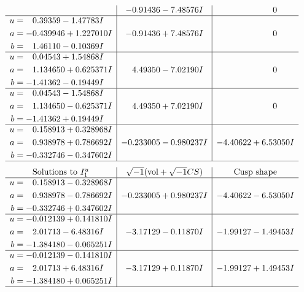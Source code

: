 \documentclass[1p]{elsarticle_modified}
\theoremstyle{definition}
\newcommand{\I}{\sqrt{-1}}
\begin{document}
$$\begin{array}{c|c|c}
 & -0.91436 - 7.48576 I & \phantom{-0.000000 } 0 \\ \hline\begin{aligned}
u &= \phantom{-}0.39359 - 1.47783 I \\
a &= -0.439946 + 1.227010 I \\
b &= \phantom{-}1.46110 - 0.10369 I\end{aligned}
 & -0.91436 + 7.48576 I & \phantom{-0.000000 } 0 \\ \hline\begin{aligned}
u &= \phantom{-}0.04543 + 1.54868 I \\
a &= \phantom{-}1.134650 + 0.625371 I \\
b &= -1.41362 - 0.19449 I\end{aligned}
 & \phantom{-}4.49350 - 7.02190 I & \phantom{-0.000000 } 0 \\ \hline\begin{aligned}
u &= \phantom{-}0.04543 - 1.54868 I \\
a &= \phantom{-}1.134650 - 0.625371 I \\
b &= -1.41362 + 0.19449 I\end{aligned}
 & \phantom{-}4.49350 + 7.02190 I & \phantom{-0.000000 } 0 \\ \hline\begin{aligned}
u &= \phantom{-}0.158913 + 0.328968 I \\
a &= \phantom{-}0.938978 + 0.786692 I \\
b &= -0.332746 - 0.347602 I\end{aligned}
 & -0.233005 - 0.980237 I & -4.40622 + 6.53050 I\\
 \hline 
 \end{array}$$\newpage$$\begin{array}{c|c|c}  
\text{Solutions to }I^u_{1}& \I (\text{vol} + \sqrt{-1}CS) & \text{Cusp shape}\\
 \hline 
\begin{aligned}
u &= \phantom{-}0.158913 - 0.328968 I \\
a &= \phantom{-}0.938978 - 0.786692 I \\
b &= -0.332746 + 0.347602 I\end{aligned}
 & -0.233005 + 0.980237 I & -4.40622 - 6.53050 I \\ \hline\begin{aligned}
u &= -0.012139 + 0.141810 I \\
a &= \phantom{-}2.01713 - 6.48316 I \\
b &= -1.384180 - 0.065251 I\end{aligned}
 & -3.17129 - 0.11870 I & -1.99127 - 1.49453 I \\ \hline\begin{aligned}
u &= -0.012139 - 0.141810 I \\
a &= \phantom{-}2.01713 + 6.48316 I \\
b &= -1.384180 + 0.065251 I\end{aligned}
 & -3.17129 + 0.11870 I & -1.99127 + 1.49453 I\\
 \hline 
 \end{array}$$\newpage
\end{document}
